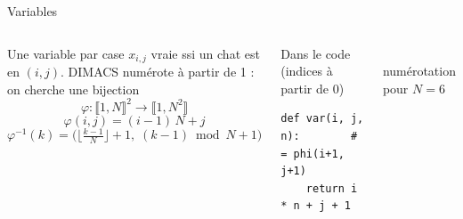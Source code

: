 \documentclass[aspectratio=169,11pt]{beamer}
\begin{document}
\begin{frame}[fragile]{Variables}
  \begin{columns}[T]
    \begin{block}{Une variable par case}
      $x_{i,j}$ vraie ssi un chat est en $(i,j)$. DIMACS numérote à partir de 1 :
      on cherche une bijection
      \[ \varphi : \llbracket 1,N \rrbracket^2 \to \llbracket 1,N^2 \rrbracket \]
      \[ \varphi(i,j) = (i-1)\,N + j \]
      \[ \varphi^{-1}(k) = \big(\lfloor \tfrac{k-1}{N} \rfloor + 1,\; (k-1) \bmod N + 1\big) \]
    \end{block}
    \begin{block}{Dans le code (indices à partir de 0)}
\begin{lstlisting}
def var(i, j, n):        # = phi(i+1, j+1)
    return i * n + j + 1
\end{lstlisting}
    \end{block}
    \centering
     \\[2pt]
    \footnotesize numérotation pour $N = 6$
  \end{columns}
\end{frame}
\end{document}
